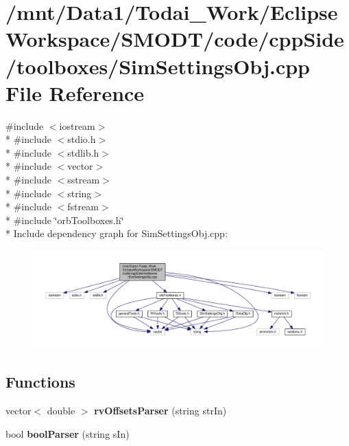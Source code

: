 \section{/mnt/\-Data1/\-Todai\-\_\-\-Work/\-Eclipse\-Workspace/\-S\-M\-O\-D\-T/code/cpp\-Side/toolboxes/\-Sim\-Settings\-Obj.cpp File Reference}
\label{_sim_settings_obj_8cpp}
{\ttfamily \#include $<$iostream$>$}\\*
{\ttfamily \#include $<$stdio.\-h$>$}\\*
{\ttfamily \#include $<$stdlib.\-h$>$}\\*
{\ttfamily \#include $<$vector$>$}\\*
{\ttfamily \#include $<$sstream$>$}\\*
{\ttfamily \#include $<$string$>$}\\*
{\ttfamily \#include $<$fstream$>$}\\*
{\ttfamily \#include \char`\"{}orb\-Toolboxes.\-h\char`\"{}}\\*
Include dependency graph for Sim\-Settings\-Obj.\-cpp\-:
\nopagebreak
\begin{figure}[H]
\begin{center}
\leavevmode
\includegraphics[width=350pt]{_sim_settings_obj_8cpp__incl}
\end{center}
\end{figure}
\subsection*{Functions}
\begin{DoxyCompactItemize}
\item 
vector$<$ double $>$ {\bf rv\-Offsets\-Parser} (string str\-In)
\item 
bool {\bf bool\-Parser} (string s\-In)
\end{DoxyCompactItemize}


